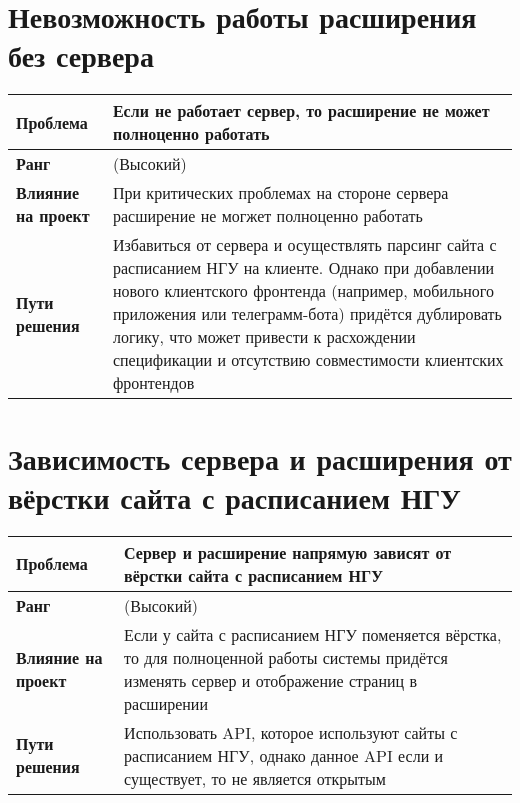 	\section{Невозможность работы расширения без сервера}
		\begin{tabularx}{\textwidth}{
				| >{\centering\arraybackslash\hsize=4cm}X
				| >{\centering\arraybackslash}X
				|}
			\hline
			\textbf{Проблема} &  Если не работает сервер, то расширение не может полноценно работать \\\hline
			\textbf{Ранг} &  7 (Высокий) \\\hline
			\textbf{Влияние на проект} &  При критических проблемах на стороне сервера расширение не могжет полноценно работать \\\hline
			\textbf{Пути решения} &  Избавиться от сервера и осуществлять парсинг сайта с расписанием НГУ на клиенте. Однако при добавлении нового клиентского фронтенда (например, мобильного приложения или телеграмм-бота) придётся дублировать логику, что может привести к расхождении спецификации и отсутствию совместимости клиентских фронтендов  \\\hline
		\end{tabularx}
	\section{Зависимость сервера и расширения от вёрстки сайта с расписанием НГУ}
		\begin{tabularx}{\textwidth}{
				| >{\centering\arraybackslash\hsize=4cm}X
				| >{\centering\arraybackslash}X
				|}
			\hline
			\textbf{Проблема} & Сервер и расширение напрямую зависят от вёрстки сайта с расписанием НГУ \\\hline
			\textbf{Ранг} &  8 (Высокий) \\\hline
			\textbf{Влияние на проект} & Если у сайта с расписанием НГУ поменяется вёрстка, то для полноценной работы системы придётся изменять сервер и отображение страниц в расширении \\\hline
			\textbf{Пути решения} &  Использовать API, которое используют сайты с расписанием НГУ, однако данное API если и существует, то не является открытым \\\hline
		\end{tabularx}
